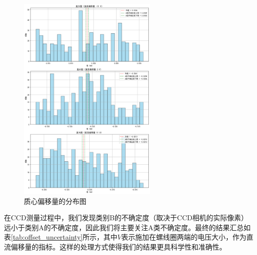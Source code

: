 \documentclass[12pt]{ctexart}
\numberwithin{equation}{section} %
\begin{document}
\begin{figure}[H] %
    \centering %
    \includegraphics[width=0.6\textwidth]{质心偏移量的分布.png} %
    \caption{质心偏移量的分布图} %
    \label{fig:质心偏移量的分布图} %
\end{figure}
在CCD测量过程中，我们发现类别B的不确定度（取决于CCD相机的实际像素）远小于类别A的不确定度，因此我们将主要关注A类不确定度。最终的结果汇总如表\ref{tab:offset_uncertainty}所示，其中$V$表示施加在螺线圈两端的电压大小，作为直流偏移量的指标。这样的处理方式使得我们的结果更具科学性和准确性。
\end{document}
